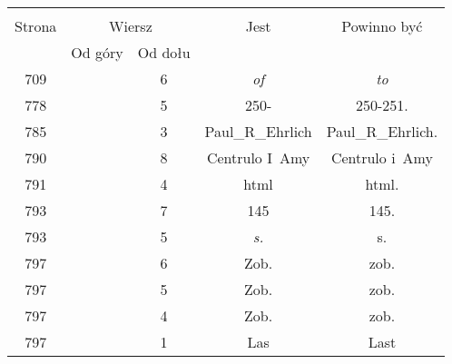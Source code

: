 \documentclass[a4paper,11pt]{article}
\begin{document}
\begin{center}
  \begin{tabular}{|c|c|c|c|c|}
    \hline
    & \multicolumn{2}{c|}{} & & \\
    Strona & \multicolumn{2}{c|}{Wiersz} & Jest
                              & Powinno być \\ \cline{2-3}
    & Od góry & Od dołu & & \\
    \hline
    709 & &  6 & \textit{of} & \textit{to} \\
    778 & &  5 & 250- & 250-251. \\
    785 & &  3 & Paul\_R\_Ehrlich & Paul\_R\_Ehrlich. \\
    790 & &  8 & Centrulo I~Amy & Centrulo i~Amy \\
    791 & &  4 & html & html. \\
    793 & &  7 & 145 & 145. \\
    793 & &  5 & \textit{s.} & s. \\
    797 & &  6 & Zob. & zob. \\
    797 & &  5 & Zob. & zob. \\
    797 & &  4 & Zob. & zob. \\
    797 & &  1 & Las & Last \\
    \hline
  \end{tabular}






\end{center}
\end{document}
